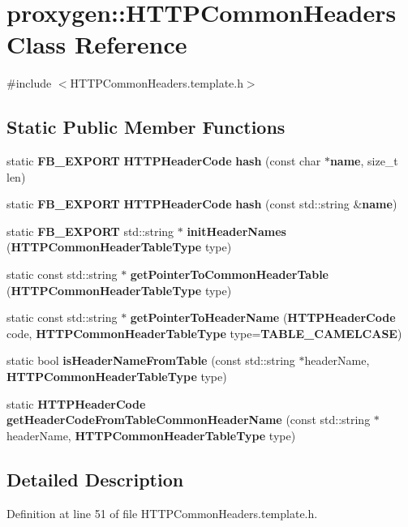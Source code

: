 \section{proxygen\+:\+:H\+T\+T\+P\+Common\+Headers Class Reference}
\label{classproxygen_1_1HTTPCommonHeaders}


{\ttfamily \#include $<$H\+T\+T\+P\+Common\+Headers.\+template.\+h$>$}

\subsection*{Static Public Member Functions}
\begin{DoxyCompactItemize}
\item 
static {\bf F\+B\+\_\+\+E\+X\+P\+O\+RT} {\bf H\+T\+T\+P\+Header\+Code} {\bf hash} (const char $\ast${\bf name}, size\+\_\+t len)
\item 
static {\bf F\+B\+\_\+\+E\+X\+P\+O\+RT} {\bf H\+T\+T\+P\+Header\+Code} {\bf hash} (const std\+::string \&{\bf name})
\item 
static {\bf F\+B\+\_\+\+E\+X\+P\+O\+RT} std\+::string $\ast$ {\bf init\+Header\+Names} ({\bf H\+T\+T\+P\+Common\+Header\+Table\+Type} type)
\item 
static const std\+::string $\ast$ {\bf get\+Pointer\+To\+Common\+Header\+Table} ({\bf H\+T\+T\+P\+Common\+Header\+Table\+Type} type)
\item 
static const std\+::string $\ast$ {\bf get\+Pointer\+To\+Header\+Name} ({\bf H\+T\+T\+P\+Header\+Code} code, {\bf H\+T\+T\+P\+Common\+Header\+Table\+Type} type={\bf T\+A\+B\+L\+E\+\_\+\+C\+A\+M\+E\+L\+C\+A\+SE})
\item 
static bool {\bf is\+Header\+Name\+From\+Table} (const std\+::string $\ast$header\+Name, {\bf H\+T\+T\+P\+Common\+Header\+Table\+Type} type)
\item 
static {\bf H\+T\+T\+P\+Header\+Code} {\bf get\+Header\+Code\+From\+Table\+Common\+Header\+Name} (const std\+::string $\ast$header\+Name, {\bf H\+T\+T\+P\+Common\+Header\+Table\+Type} type)
\end{DoxyCompactItemize}


\subsection{Detailed Description}


Definition at line 51 of file H\+T\+T\+P\+Common\+Headers.\+template.\+h.



